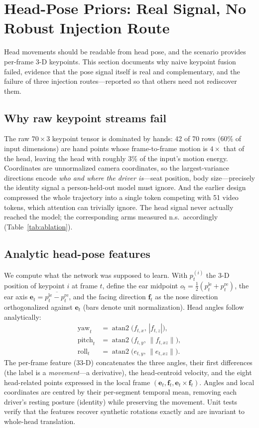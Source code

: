 \documentclass[journal]{IEEEtran}
\begin{document}
\section{Head-Pose Priors: Real Signal, No Robust Injection Route}
\label{sec:keypoints}
Head movements should be readable from head pose, and the scenario provides
per-frame 3-D keypoints.  This section documents why naive keypoint fusion
failed, evidence that the pose signal itself is real and complementary, and
the failure of three injection routes---reported so that others need not
rediscover them.

\subsection{Why raw keypoint streams fail}
The raw $70{\times}3$ keypoint tensor is dominated by hands: 42 of 70 rows
(60\% of input dimensions) are hand points whose frame-to-frame motion is
$4\times$ that of the head, leaving the head with roughly 3\% of the input's
motion energy.  Coordinates are unnormalized camera coordinates, so the
largest-variance directions encode \emph{who and where the driver
is}---seat position, body size---precisely the identity signal a
person-held-out model must ignore.  And the earlier design compressed the
whole trajectory into a single token competing with 51 video tokens, which
attention can trivially ignore.  The head signal never actually reached the
model; the corresponding arms measured n.s.\ accordingly
(Table~\ref{tab:ablation}).

\subsection{Analytic head-pose features}
We compute what the network was supposed to learn.  With $p^{(i)}_t$ the
3-D position of keypoint $i$ at frame $t$, define the ear midpoint
$o_t{=}\tfrac12(p^{\mathrm{le}}_t{+}p^{\mathrm{re}}_t)$, the ear axis
$\mathbf{e}_t{=}\overline{p^{\mathrm{le}}_t{-}p^{\mathrm{re}}_t}$, and the
facing direction $\mathbf{f}_t$ as the nose direction orthogonalized
against $\mathbf{e}_t$ (bars denote unit normalization).  Head angles
follow analytically:
\begin{align}
\mathrm{yaw}_t &= \operatorname{atan2}\!\big(f_{t,x},\,|f_{t,z}|\big),
\nonumber\\
\mathrm{pitch}_t &= \operatorname{atan2}\!\big(f_{t,y},\,
\lVert f_{t,xz}\rVert\big),\\
\mathrm{roll}_t &= \operatorname{atan2}\!\big(e_{t,y},\,
\lVert e_{t,xz}\rVert\big).\nonumber
\end{align}
The per-frame feature (33-D) concatenates the three angles, their first
differences (the label is a \emph{movement}---a derivative), the
head-centroid velocity, and the eight head-related points expressed in the
local frame $(\mathbf{e}_t,\mathbf{f}_t,\mathbf{e}_t{\times}\mathbf{f}_t)$.
Angles and local coordinates are centred by their per-segment temporal
mean, removing each driver's resting posture (identity) while preserving
the movement.  Unit tests verify that the features recover synthetic
rotations exactly and are invariant to whole-head translation.
\end{document}
